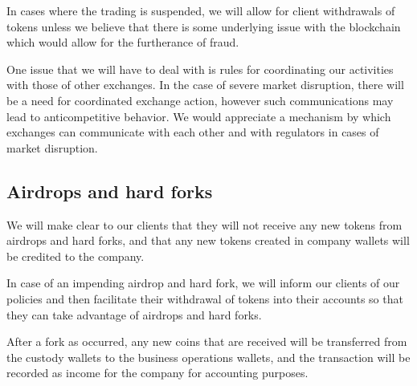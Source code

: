 In cases where the trading is suspended, we will allow for client
withdrawals of tokens unless we believe that there is some underlying
issue with the blockchain which would allow for the furtherance of
fraud.

One issue that we will have to deal with is rules for coordinating our
activities with those of other exchanges.  In the case of severe market
disruption, there will be a need for coordinated exchange action,
however such communications may lead to anticompetitive behavior.  We
would appreciate a mechanism by which exchanges can communicate with
each other and with regulators in cases of market disruption.

\subsection{Airdrops and hard forks}
We will make clear to our clients that they will not receive any
new tokens from airdrops and hard forks, and that any new tokens
created in company wallets will be credited to the company.

In case of an impending airdrop and hard fork, we will inform our
clients of our policies and then facilitate their withdrawal of tokens
into their accounts so that they can take advantage of airdrops and
hard forks.

After a fork as occurred, any new coins that are received will be transferred from the custody wallets to the business operations wallets, and the transaction will be recorded as income for the company for accounting purposes.




